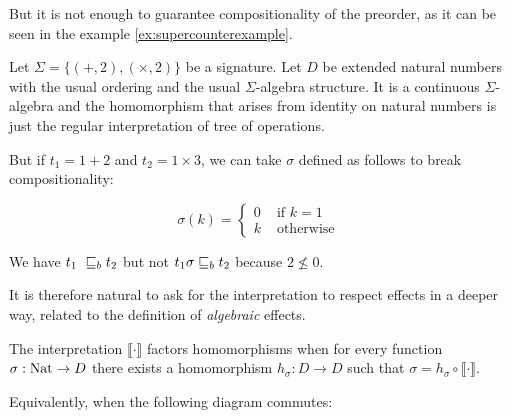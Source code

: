 But it is not enough to  guarantee compositionality of the preorder,
as it can be seen in the example \ref{ex:supercounterexample}.

\begin{example}
    \label{ex:supercounterexample}

    Let $\Sigma = \{ (+,2), (\times,2) \}$ be a signature.
    Let $D$ be extended natural numbers 
    with the usual ordering and the usual $\Sigma$-algebra
    structure. It is a continuous $\Sigma$-algebra 
    and the homomorphism that arises from identity 
    on natural numbers is just the regular interpretation 
    of tree of operations.

    But if $t_1 = 1 + 2$ and $t_2 = 1 \times 3$, we can 
    take $\sigma$ defined as follows to break compositionality:

    \begin{equation*}
        \sigma(k) = \begin{cases}
            0 & \text{ if } k = 1 \\
            k & \text{ otherwise } 
        \end{cases}
    \end{equation*}

    We have $t_1 \sqeq_b t_2$ but 
    not $t_1 \sigma \sqsubseteq_b t_2$ because $2 \not \leq 0$.
\end{example}

It is therefore natural to ask for the interpretation 
to respect effects in a deeper way, related to 
the definition of \emph{algebraic} effects.

\begin{adefinition}
    The interpretation $\llbracket \cdot \rrbracket$
    factors homomorphisms when for every function 
    $\sigma : \textnormal{Nat} \to D$ there exists a 
    homomorphism $h_\sigma : D \to D$ such that $\sigma = h_\sigma \circ \llbracket
    \cdot \rrbracket$. 
    
    Equivalently, when the following diagram commutes:

    \begin{center}
    \end{center}
\end{adefinition}

